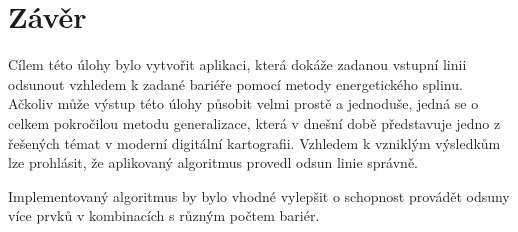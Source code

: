 \chapter*{Závěr}
\par Cílem této úlohy bylo vytvořit aplikaci, která dokáže zadanou vstupní linii odsunout vzhledem k zadané bariéře pomocí metody energetického splinu. Ačkoliv může výstup této úlohy působit velmi prostě a jednoduše, jedná se o celkem pokročilou metodu generalizace, která v dnešní době představuje jedno z řešených témat v moderní digitální kartografii. Vzhledem k vzniklým výsledkům lze prohlásit, že aplikovaný algoritmus provedl odsun linie správně.
\par Implementovaný algoritmus by bylo vhodné vylepšit o schopnost provádět odsuny více prvků v kombinacích s různým počtem bariér.